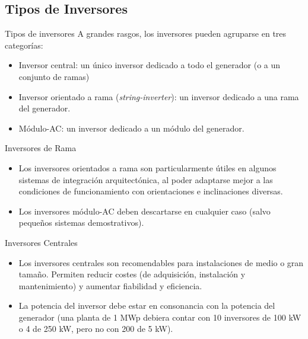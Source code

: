 \documentclass[xcolor={usenames,svgnames,dvipsnames}]{beamer}
\begin{document}
\subsection{Tipos de Inversores}
\label{sec:org6aae338}
\begin{frame}[label={sec:org60dc697}]{Tipos de inversores}
A grandes rasgos, los inversores pueden agruparse en tres categorías:

\begin{itemize}
\item \alert{Inversor central}: un único inversor dedicado a todo el generador (o
a un conjunto de ramas)

\item \alert{Inversor orientado a rama} (\emph{string-inverter}): un inversor dedicado
a una rama del generador.

\item \alert{Módulo-AC}: un inversor dedicado a un módulo del generador.
\end{itemize}
\end{frame}

\begin{frame}[label={sec:org6ef2bb2}]{Inversores de Rama}
\begin{itemize}
\item Los \alert{inversores orientados a rama} son particularmente útiles en
algunos sistemas de integración arquitectónica, al poder adaptarse
mejor a las condiciones de funcionamiento con orientaciones e
inclinaciones diversas.

\item Los inversores \alert{módulo-AC} deben descartarse en cualquier caso (salvo
pequeños sistemas demostrativos).
\end{itemize}
\end{frame}

\begin{frame}[label={sec:org8923625}]{Inversores Centrales}
\begin{itemize}
\item Los \alert{inversores centrales} son recomendables para instalaciones de
medio o gran tamaño. Permiten reducir costes (de adquisición,
instalación y mantenimiento) y aumentar fiabilidad y eficiencia.

\item \alert{La potencia del inversor debe estar en consonancia con la potencia
del generador} (una planta de 1 MWp debiera contar con 10 inversores
de 100 kW o 4 de 250 kW, pero no con 200 de 5 kW).
\end{itemize}
\end{frame}
\end{document}
